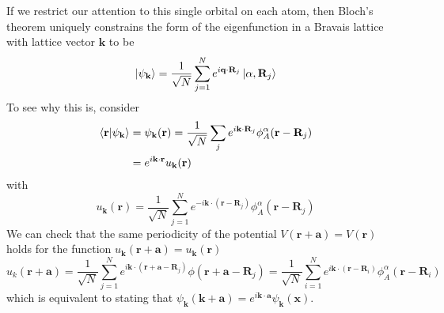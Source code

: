 \documentclass[11pt, a4paper]{article}
\theoremstyle{definition} %
\begin{document}
If we restrict our attention to this single orbital on each atom, then Bloch's theorem uniquely constrains the form of the eigenfunction in a Bravais lattice with lattice vector $\mathbf{k}$ to be
\begin{equation}
	\ket{\psi_{\mathbf{k}}} = \frac{1}{\sqrt{N}} \sum_{j=1}^N e^{i \mathbf{q} \cdot \mathbf{R}_j} \ket{\alpha, \mathbf{R}_j}
\end{equation}
To see why this is, consider
\begin{align}
	\braket{\mathbf{r}}{\psi_{\mathbf{k}}} &= \psi_{\mathbf{k}}(\mathbf{r}) = \frac{1}{\sqrt{N}} \sum_j e^{i \mathbf{k} \cdot \mathbf{R}_j} \phi_A^{\alpha}(\mathbf{r} - \mathbf{R}_j) \\
	&= e^{i \mathbf{k} \cdot \mathbf{r}} u_{\mathbf{k}}(\mathbf{r})
\end{align}
with
\begin{equation}
	u_{\mathbf{k}}(\mathbf{r}) = \frac{1}{\sqrt{N}} \sum_{j=1}^N e^{-i\mathbf{k} \cdot (\mathbf{r} - \mathbf{R}_j)} \phi_A^\alpha(\mathbf{r} - \mathbf{R}_j)
\end{equation}
We can check that the same periodicity of the potential $V(\mathbf{r} + \mathbf{a}) = V(\mathbf{r})$ holds for the function $u_{\mathbf{k}}(\mathbf{r} + \mathbf{a}) = u_{\mathbf{k}}(\mathbf{r})$
\begin{equation}
	u_k(\mathbf{r} + \mathbf{a}) = \frac{1}{\sqrt{N}} \sum_{j=1}^N e^{i \mathbf{k} \cdot (\mathbf{r} + \mathbf{a} - \mathbf{R}_j)} \phi(\mathbf{r} + \mathbf{a} - \mathbf{R}_j) = \frac{1}{\sqrt{N}} \sum_{i=1}^N e^{i \mathbf{k} \cdot (\mathbf{r} - \mathbf{R}_{i})} \phi_{A}^\alpha(\mathbf{r} - \mathbf{R}_i)
\end{equation}
which is equivalent to stating that $\psi_{\mathbf{k}}(\mathbf{k} + \mathbf{a}) =e^{i \mathbf{k} \cdot \mathbf{a}} \psi_{\mathbf{k}}(\mathbf{x})$.
\end{document}
